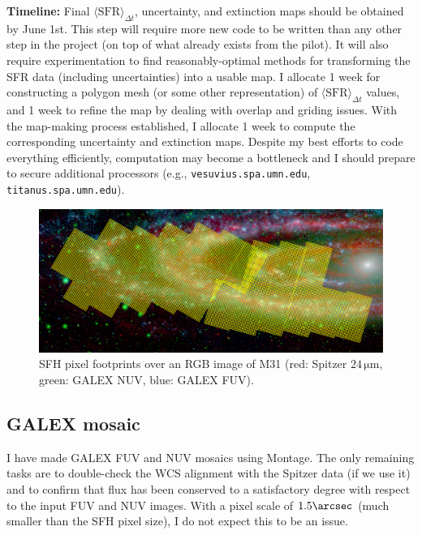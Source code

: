 \documentclass[preprint,11pt]{aastex}
\begin{document}
\textbf{Timeline:} Final $\langle \mathrm{SFR}\rangle_{\Delta t}$, uncertainty,
and extinction maps should be obtained by June 1st. This step will require more
new code to be written than any other step in the project (on top of what
already exists from the pilot). It will also require experimentation to find
reasonably-optimal methods for transforming the SFR data (including
uncertainties) into a usable map. I allocate 1 week for constructing a polygon
mesh (or some other representation) of $\langle \mathrm{SFR}\rangle_{\Delta t}$
values, and 1 week to refine the map by dealing with overlap and griding
issues. With the map-making process established, I allocate 1 week to compute
the corresponding uncertainty and extinction maps. Despite my best efforts to
code everything efficiently, computation may become a bottleneck and I should
prepare to secure additional processors (e.g., \texttt{vesuvius.spa.umn.edu},
\texttt{titanus.spa.umn.edu}).


\begin{figure}
\centering
\includegraphics[angle=-90,scale=0.52]{quick_rgb.pdf}
\caption{SFH pixel footprints over an RGB image of M31 (red: Spitzer
    $24\,\mathrm{\mu m}$, green: GALEX NUV, blue: GALEX FUV).
}
\label{fig:map}
\end{figure}



\subsection{GALEX mosaic}

I have made GALEX FUV and NUV mosaics using Montage. The only remaining tasks
are to double-check the WCS alignment with the Spitzer data (if we use it) and
to confirm that flux has been conserved to a satisfactory degree with respect
to the input FUV and NUV images. With a pixel scale of $1.5\arcsec$ (much
smaller than the SFH pixel size), I do not expect this to be an issue.
\end{document}
